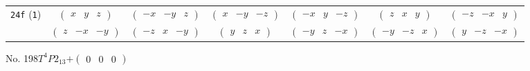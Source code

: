 \documentclass[fleqn,9pt,landscape]{jsarticle}
\begin{document}
\begin{center}
\begin{longtable}{ccccccc}
{\tt 24f} ({\tt 1}) & $ \begin{pmatrix} x & y & z \end{pmatrix} $ & $ \begin{pmatrix} - x & - y & z \end{pmatrix} $ & $ \begin{pmatrix} x & - y & - z \end{pmatrix} $ & $ \begin{pmatrix} - x & y & - z \end{pmatrix} $ & $ \begin{pmatrix} z & x & y \end{pmatrix} $ & $ \begin{pmatrix} - z & - x & y \end{pmatrix} $ \\
& $ \begin{pmatrix} z & - x & - y \end{pmatrix} $ & $ \begin{pmatrix} - z & x & - y \end{pmatrix} $ & $ \begin{pmatrix} y & z & x \end{pmatrix} $ & $ \begin{pmatrix} - y & z & - x \end{pmatrix} $ & $ \begin{pmatrix} - y & - z & x \end{pmatrix} $ & $ \begin{pmatrix} y & - z & - x \end{pmatrix} $ \\
\end{longtable}
\end{center}
\newpage
No. 198\quad$T_{}^{4}$\quad$P2_13$\quad[ cubic ]\quad$+\begin{pmatrix} 0 & 0 & 0 \end{pmatrix}$
\end{document}
